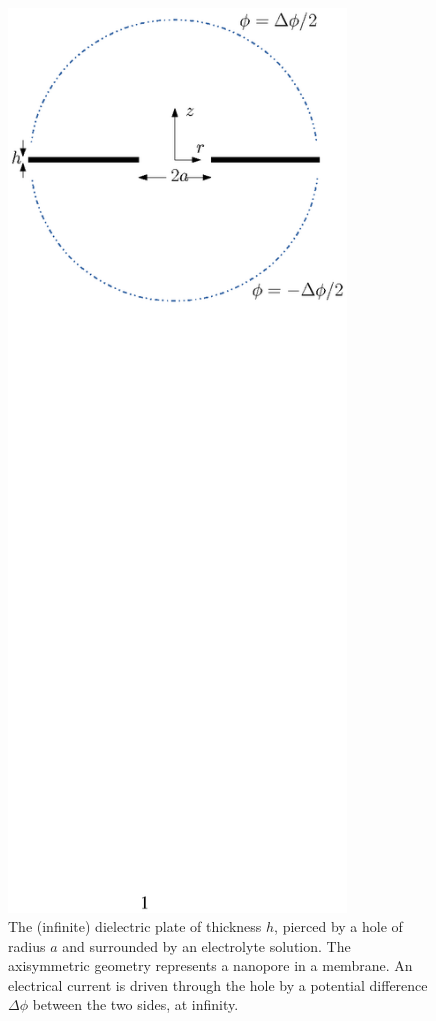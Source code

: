 \begin{figure}[ht]
\begin{center}
\includegraphics[width=0.8\textwidth,clip=true]{eddies/eddy_fig1b.eps}
\end{center}
\caption{The (infinite)
dielectric plate of thickness $h$, pierced by a hole of radius $a$
and surrounded by
an electrolyte solution. 
The axisymmetric geometry represents a nanopore in a membrane.
An electrical current is driven through the hole by a potential difference
$\Delta\phi$ between the two sides, at infinity.}
\label{fig:hole}
\end{figure}


